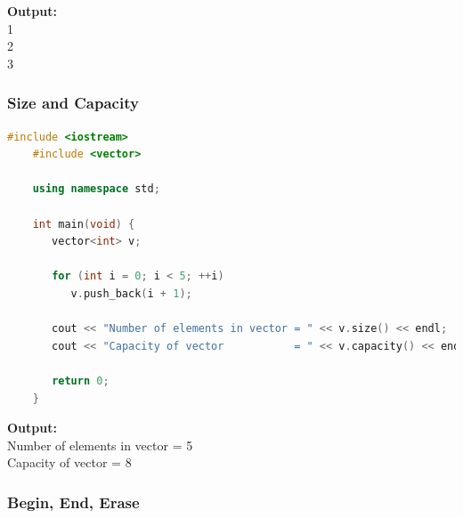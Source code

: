 \documentclass[12pt , a4paper]{article}
\begin{document}
	\begin{tcolorbox}
	\textbf{Output:}\\
	1\\
	2\\
	3
	\end{tcolorbox}


	\subsubsection{Size and Capacity}
	\begin{lstlisting}[language=C++]
	#include <iostream>
	#include <vector>
	
	using namespace std;
	
	int main(void) {
	   vector<int> v;
	
	   for (int i = 0; i < 5; ++i)
	      v.push_back(i + 1);
	
	   cout << "Number of elements in vector = " << v.size() << endl;
	   cout << "Capacity of vector           = " << v.capacity() << endl;
	
	   return 0;
	}
	\end{lstlisting}

	\begin{tcolorbox}
	\textbf{Output:}\\
	Number of elements in vector = 5\\
	Capacity of vector           = 8
	\end{tcolorbox}


	\subsubsection{Begin, End, Erase}
\end{document}
